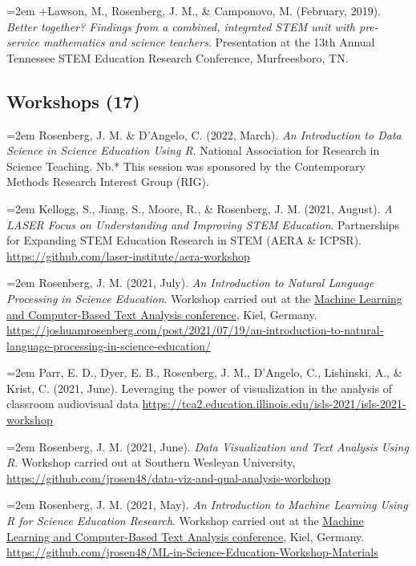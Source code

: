 \documentclass[
  14,
]{article}
\begin{document}
\hangindent=2em +Lawson, M., Rosenberg, J. M., \& Camponovo, M.
(February, 2019). \emph{Better together? Findings from a combined,
integrated STEM unit with pre-service mathematics and science teachers}.
Presentation at the 13th Annual Tennessee STEM Education Research
Conference, Murfreesboro, TN.

\hypertarget{workshops-17}{%
\subsection{Workshops (17)}\label{workshops-17}}

\hangindent=2em Rosenberg, J. M. \& D'Angelo, C. (2022, March). \emph{An
Introduction to Data Science in Science Education Using R}. National
Association for Research in Science Teaching. Nb.* This session was
sponsored by the Contemporary Methods Research Interest Group (RIG).

\hangindent=2em Kellogg, S., Jiang, S., Moore, R., \& Rosenberg, J. M.
(2021, August). \emph{A LASER Focus on Understanding and Improving STEM
Education}. Partnerships for Expanding STEM Education Research in STEM
(AERA \& ICPSR). \url{https://github.com/laser-institute/aera-workshop}

\hangindent=2em Rosenberg, J. M. (2021, July). \emph{An Introduction to
Natural Language Processing in Science Education}. Workshop carried out
at the
\href{https://www.ipn.uni-kiel.de/en/the-ipn/news/gdcp-focus-conference-machine-learning-and-computer-based-text-analysis-may-6th-7th-2021-register-now}{Machine
Learning and Computer-Based Text Analysis conference}, Kiel, Germany.
\url{https://joshuamrosenberg.com/post/2021/07/19/an-introduction-to-natural-language-processing-in-science-education/}

\hangindent=2em Parr, E. D., Dyer, E. B., Rosenberg, J. M., D'Angelo,
C., Lishinski, A., \& Krist, C. (2021, June). Leveraging the power of
visualization in the analysis of classroom audiovisual data
\url{https://tca2.education.illinois.edu/isls-2021/isls-2021-workshop}

\hangindent=2em Rosenberg, J. M. (2021, June). \emph{Data Visualization
and Text Analysis Using R}. Workshop carried out at Southern Wesleyan
University,
\url{https://github.com/jrosen48/data-viz-and-qual-analysis-workshop}

\hangindent=2em Rosenberg, J. M. (2021, May). \emph{An Introduction to
Machine Learning Using R for Science Education Research}. Workshop
carried out at the
\href{https://www.ipn.uni-kiel.de/en/the-ipn/news/gdcp-focus-conference-machine-learning-and-computer-based-text-analysis-may-6th-7th-2021-register-now}{Machine
Learning and Computer-Based Text Analysis conference}, Kiel, Germany.
\url{https://github.com/jrosen48/ML-in-Science-Education-Workshop-Materials}
\end{document}
